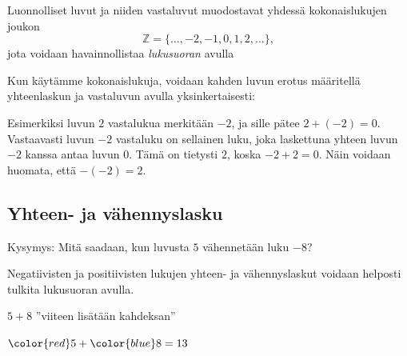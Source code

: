 
Luonnolliset luvut ja niiden vastaluvut muodostavat yhdessä
kokonaislukujen joukon
\[\mathbb{Z} = \{\ldots, -2, -1, 0, 1, 2, \ldots\},\]
jota voidaan havainnollistaa \emph{lukusuoran} avulla

\begin{center}
\begin{lukusuora}{-4}{4}{10}

\end{lukusuora}
\end{center}

Kun käytämme kokonaislukuja, voidaan kahden luvun erotus määritellä
yhteenlaskun ja vastaluvun avulla yksinkertaisesti:

\laatikko{
\[m-n = m+(-n)\]
}

    Esimerkiksi luvun $2$ vastalukua merkitään $-2$, ja sille pätee $2+(-2)=0$. Vastaavasti luvun $-2$ vastaluku on sellainen luku, joka laskettuna yhteen luvun $-2$ kanssa antaa luvun $0$. Tämä on tietysti $2$, koska $-2+2=0$. Näin voidaan huomata, että $-(-2)=2$.
    

\subsection*{Yhteen- ja vähennyslasku}

    Kysymys: Mitä saadaan, kun luvusta $5$ vähennetään luku $-8$?
    
    Negatiivisten ja positiivisten lukujen yhteen- ja vähennyslaskut voidaan helposti tulkita lukusuoran avulla.
    
    
    $5+8$ ''viiteen lisätään kahdeksan''
    \begin{center}
      \begin{lukusuora}{-1}{14}{14}
        {\color{red} }
        \lukusuorauusi
        {\color{red} }
        {\color{blue} }
       \end{lukusuora}
       ${\color{red}5}+{\color{blue}8}=13$
    \end{center}
    

